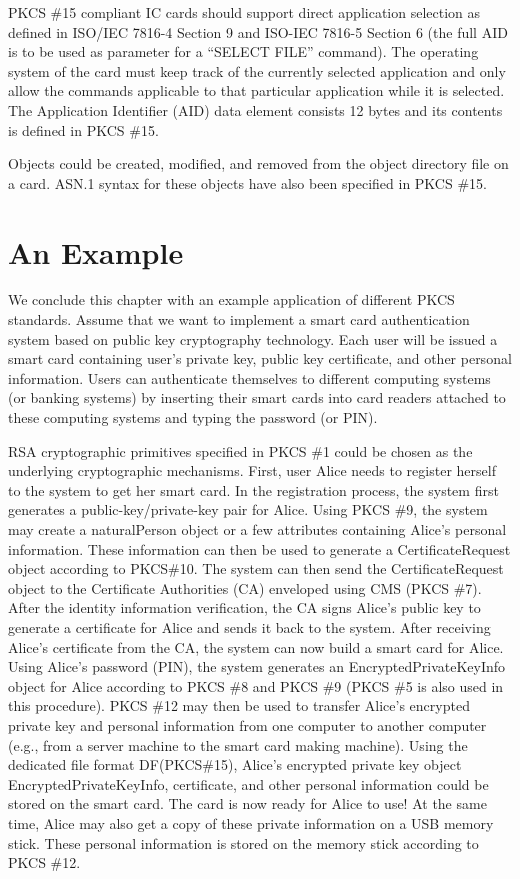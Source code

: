 \documentclass{article}
\begin{document}
PKCS \#15 compliant IC cards should support direct application
selection as defined in ISO/IEC 7816-4 Section 9 and ISO-IEC 7816-5
Section 6 (the full AID is to be used as parameter for a 
``SELECT FILE'' command). The operating system of the card 
must keep track of the currently selected application and only allow
the commands applicable to that particular application while it is 
selected. The Application Identifier (AID) data element 
consists 12 bytes and its contents is defined in PKCS \#15.

Objects could be created, modified, and removed from the object 
directory file on a card. ASN.1 syntax for these objects have also 
been specified in PKCS \#15.

\section{An Example}
\label{conclusion}
We conclude this chapter with an example application of different
PKCS standards. Assume that we want to implement a smart card 
authentication system based on public key cryptography technology. 
Each user will be issued a smart card containing user's private
key, public key certificate, and other personal information.
Users can authenticate themselves to different computing systems 
(or banking systems) by inserting their
smart cards into card readers attached to these computing systems 
and typing the password (or PIN).

RSA cryptographic primitives specified in PKCS \#1 could be chosen as the
underlying cryptographic mechanisms. First, user Alice needs to 
register herself
to the system to get her smart card. In the registration process,
the system first generates a public-key/private-key pair for Alice.
Using PKCS \#9, the system may create a naturalPerson object or a few
attributes containing Alice's personal information. These information
can then be used to generate a CertificateRequest object according to
PKCS\#10. The system can then send the CertificateRequest object
to the Certificate Authorities (CA) enveloped using 
CMS (PKCS \#7). After the
identity information verification, the CA signs Alice's public key
to generate a certificate for Alice and sends it back to the system.
After receiving Alice's certificate from the CA, the system can now
build a smart card for Alice. Using Alice's password (PIN), the system
generates an EncryptedPrivateKeyInfo object for Alice according to 
PKCS \#8 and PKCS \#9 (PKCS \#5 is also used in this procedure). 
PKCS \#12 may then be used
to transfer Alice's encrypted private key and 
personal information from one computer to another
computer (e.g., from a server machine to the smart card making machine).
Using the dedicated file format DF(PKCS\#15), Alice's encrypted private
key object EncryptedPrivateKeyInfo, certificate, and other personal 
information could be stored on the smart card. The card is now ready
for Alice to use! At the same time, Alice may also get a copy
of these private information on a USB memory stick. These personal information
is stored on the memory stick according to PKCS \#12. 
\end{document}
